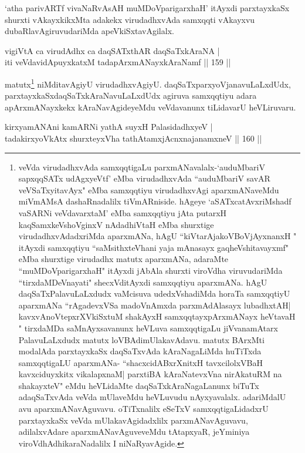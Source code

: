 \begin{artha}
`atha parivARTf vivaNaRvAsAH muMDoV\s parigarxhaH' itAyxdi parxtayxkaSx shurxti vAkayxkikxMta adakekx virudadhxvAda samxqqti vAkayxvu dubaRlavAgiruvudariMda apeVkiSxtavAgilalx.
\end{artha}

\begin{shl}
vigiVtA ca virudAdhx ca daqSATxthAR daqSaTxkAraNA |\\
iti veVdavidA\s puyxkatxM tadapArxmANayxkAraNamf \hfill || 159 ||
\end{shl}

\begin{artha}
matutx\footnote[1]{veVda virudadhxvAda samxqqtigaLu parxmANavalalx-`auduMbariV sapxqqSATx udAgxyeVtf' eMba virudadhxvAda ``auduMbariV savAR veVSaTxyitavAyx" eMba samxqqtiyu virudadhxvAgi aparxmANaveMdu miVmAMsA dashaRnadalilx tiVmARniside. hAgeye `aSATxcatAvxriMshadf vaSARNi veVdavarxtaM' eMba samxqqtiyu jAta putarxH kaqSamxkeVshoV\s ginxV nAdadhiVtaH eMba shurxtige virudadhxvAdadxriMda aparxmANa, hAgU ``kiVtarAjakoV\s BoVjAyxnanxH " itAyxdi samxqqtiyu ``saMsithxteV\s hani yaja mAnasayx gaqheV\s shitavayxmf" eMba shurxtige virudadhx matutx aparxmANa, adaraMte ``muMDoV\s parigarxhaH" itAyxdi jAbAla shurxti viroVdha viruvudariMda ``tirxdaMDeVnayati" shecxVditAyxdi samxqqtiyu aparxmANa. hAgU daqSaTxPalavuLaLxdudx vaMcisuva udedxVshadiMda horaTa samxqqtiyU aparxmANa ``rAgadevxVSa madoVnAmxda parxmAdAlasayx lubadhxtAH| kavxvAnoVtepxrXVkiSxtuM shakAyxH samxqqtayxpArxmANayx heVtavaH " tirxdaMDa saMnAyxsavanunx heVLuva samxqqtigaLu jiVvanamAtarx PalavuLaLxdudx matutx loVBAdimUlakavAdavu. matutx BArxMti modalAda parxtayxkaSx daqSaTxvAda kAraNagaLiMda huTiTxda samxqqtigaLU aparxmANa- ``shacxcidABxrXnitxH tavxcilolxVBaH kavxciduyxkitx vikalapxnaM| parxtiBA kAraNatevxVna nirAkatuRM na shakayxteV" eMdu heVLidaMte daqSaTxkAraNagaLanunx biTuTx adaqSaTxvAda veVda mUlaveMdu heVLuvudu nAyxyavalalx. adariMdalU avu aparxmANavAguvavu. oTiTxnalilx eSeTxV samxqqtigaLidadxrU parxtayxkaSx veVda mUlakavAgidadxlilx parxmANavAguvavu, adilalxvAdare aparxmANavAguveveMdu tAtapxyaR, jeYminiya viroVdhAdhikaraNadalilx I niNaRyavAgide.} niMditavAgiyU virudadhxvAgiyU. daqSaTxparxyoVjanavuLaLxdUdx, parxtayxkaSxdaqSaTxkAraNavuLaLxdUdx agiruva samxqqtiyu adara apArxmANayxkekx kAraNavAgideyeMdu veVdavanunx tiLidavarU heVLiruvaru.
\end{artha}

\begin{shl}
kirxyamANAni kamARNi yathA suyxH PalasidadhxyeV |\\
tadakirxyoVkAtx shurxteyxVha tathA\s \s tamxjAcnxnajanamxneV \hfill || 160 ||
\end{shl}	

